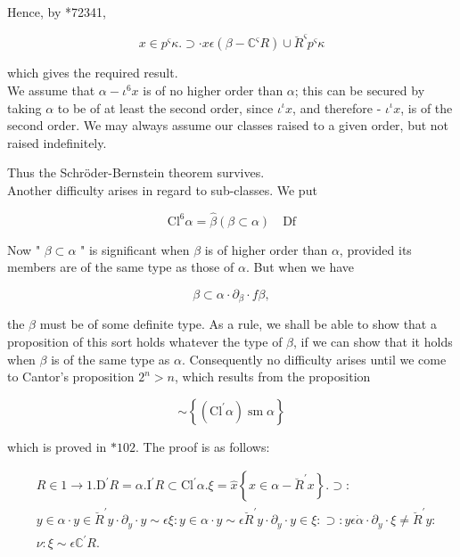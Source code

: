 \documentclass[10pt]{article}
\begin{document}
Hence, by *72341,

$$
x \in p^{\varsigma} \kappa . \supset \cdot x \epsilon\left(\beta-\mathbb{C}^{\varsigma} R\right) \cup \breve{R}^{\varsigma} p^{\varsigma} \kappa
$$

which gives the required result.\\
We assume that $\alpha-\iota^{6} x$ is of no higher order than $\alpha$; this can be secured by taking $\alpha$ to be of at least the second order, since $\iota^{\iota} x$, and therefore - $\iota^{\iota} x$, is of the second order. We may always assume our classes raised to a given order, but not raised indefinitely.

Thus the Schröder-Bernstein theorem survives.\\
Another difficulty arises in regard to sub-classes. We put

$$
\mathrm{Cl}^{6} \alpha=\hat{\beta}(\beta \subset \alpha) \quad \mathrm{Df}
$$

Now " $\beta \subset \alpha$ " is significant when $\beta$ is of higher order than $\alpha$, provided its members are of the same type as those of $\alpha$. But when we have

$$
\beta \subset \alpha \cdot \partial_{\beta} \cdot f \beta,
$$

the $\beta$ must be of some definite type. As a rule, we shall be able to show that a proposition of this sort holds whatever the type of $\beta$, if we can show that it holds when $\beta$ is of the same type as $\alpha$. Consequently no difficulty arises until we come to Cantor's proposition $2^{n}>n$, which results from the proposition

$$
\sim\left\{\left(\mathrm{Cl}^{\prime} \alpha\right) \operatorname{sm} \alpha\right\}
$$

which is proved in $* 102$. The proof is as follows:

$$
\begin{aligned}
& R \in 1 \rightarrow 1 . \mathrm{D}^{\prime} R=\alpha . \mathrm{I}^{\prime} R \subset \mathrm{Cl}^{\prime} \alpha . \xi=\hat{x}\left\{x \in \alpha-\breve{R}^{\prime} x\right\} . \supset: \\
& y \in \alpha \cdot y \in \breve{R}^{\prime} y \cdot \partial_{y} \cdot y \sim \epsilon \xi: y \in \alpha \cdot y \sim \epsilon \breve{R}^{\prime} y \cdot \partial_{y} \cdot y \in \xi: \supset: y \epsilon \dot{\alpha} \cdot \partial_{y} \cdot \xi \neq \breve{R}^{\prime} y: \\
& \nu: \xi \sim \epsilon \mathbb{C}^{\prime} R .
\end{aligned}
$$
\end{document}
